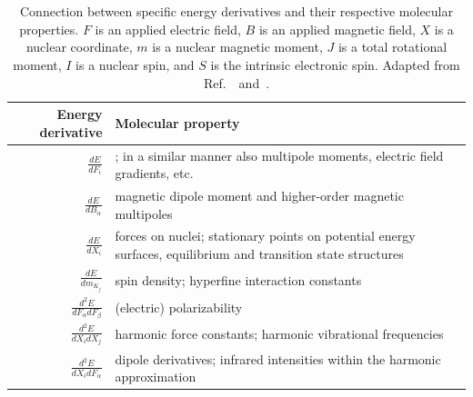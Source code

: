\documentclass[%
class = book,%
crop = false,%
float = true,%
multi = true,%
preview = false,%
]{standalone}
\begin{document}
\section[\texorpdfstring{\caps{Macroscopic and Microscopic Response Connections}}{Macroscopic and Microscopic Response Connections}]{\texorpdfstring{}{Connection Between Macroscopic and Microscopic Properties}}
\label{sec:connection-between-macroscopic-and-microscopic}

\begin{table}
  \centering
  \caption[Connection between energy derivatives and molecular properties]{Connection between specific energy derivatives and their respective molecular properties. \(F\) is an applied electric field, \(B\) is an applied magnetic field, \(X\) is a nuclear coordinate, \(m\) is a nuclear magnetic moment, \(J\) is a total rotational moment, \(I\) is a nuclear spin, and \(S\) is the intrinsic electronic spin. Adapted from Ref.~\parencite{gauss2000}~and~\parencite{jensen2013introduction}.\label{tab:gauss}}
  \begin{singlespace}
    \begin{tabulary}{1.00\textwidth}{rL}
      \toprule
      \textbf{Energy derivative} & \textbf{Molecular property} \\
      \midrule
      \(\frac{dE}{dF_{i}}\)                          & \href{https://chemistry.stackexchange.com/q/31075/194}{\color{black}{dipole moment}}; in a similar manner also multipole moments, electric field gradients, etc. \\
      \(\frac{dE}{dB_{\alpha}}\)                     & magnetic dipole moment and higher-order magnetic multipoles \\
      \(\frac{dE}{dX_{i}}\)                          & forces on nuclei; stationary points on potential energy surfaces, equilibrium and transition state structures \\
      \(\frac{dE}{dm_{K_{j}}}\)                      & spin density; hyperfine interaction constants \\
      \(\frac{d^{2}E}{dF_{\alpha}dF_{\beta}}\)       & (electric) polarizability \\
      \(\frac{d^{2}E}{dX_{i}dX_{j}}\)                & harmonic force constants; harmonic vibrational frequencies \\
      \(\frac{d^{2}E}{dX_{i}dF_{\alpha}}\)           & dipole derivatives; infrared intensities within the harmonic approximation \\

\end{tabulary}
\end{singlespace}
\end{table}
\end{document}
